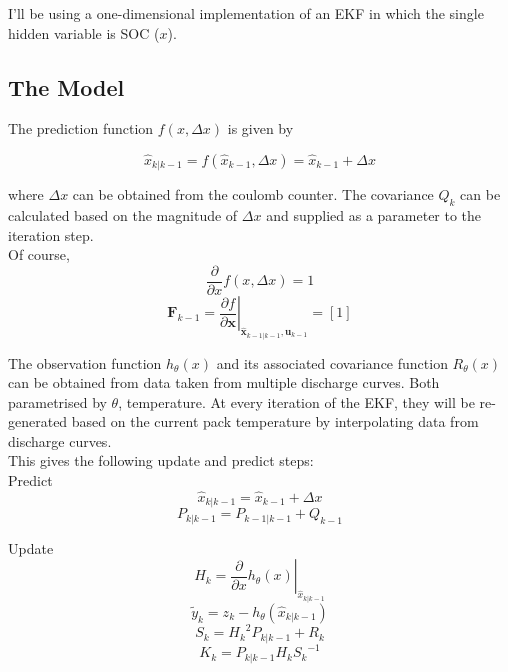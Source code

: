 \documentclass[letterpaper,12pt]{article} %
\begin{document}
I'll be using a one-dimensional implementation of an EKF in which the single hidden variable is SOC ($x$).

\newpage

\subsection{The Model}

The prediction function $ f(x, \Delta x) $ is given by

\begin{equation}
\hat{x}_{k|k-1} = f(\hat{x}_{k-1}, \Delta x) = \hat{x}_{k-1} + \Delta x
\end{equation}

where $ \Delta x $ can be obtained from the coulomb counter. The covariance $ Q_k $ can be calculated based on the magnitude of $ \Delta x $ and supplied as a parameter to the iteration step. \\

Of course,
\begin{equation}
\frac{\partial}{\partial x} f(x, \Delta x) = 1
\end{equation}
\begin{equation}
\boldsymbol{F}_{k-1} = \left . \frac{\partial f}{\partial \boldsymbol{x} } \right \vert _{\hat{\boldsymbol{x}}_{k-1|k-1},\boldsymbol{u}_{k-1}} = [1]
\end{equation}


The observation function $ h_{\theta}(x) $ and its associated covariance function $ R_{\theta}(x) $ can be obtained from data taken from multiple discharge curves. Both parametrised by $ \theta $, temperature. At every iteration of the EKF, they will be re-generated based on the current pack temperature by interpolating data from discharge curves.\\

This gives the following update and predict steps:\\

Predict
\begin{equation}
\hat{x}_{k|k-1} = \hat{x}_{k-1} + \Delta x
\end{equation}
\begin{equation}
P_{k|k-1} =  P_{k-1|k-1} + Q_{k-1}
\end{equation}

Update
\begin{equation}
H_k = \left. \frac{\partial}{\partial x}h_\theta(x) \right \vert _{\hat{x}_{k|k-1}}
\end{equation}
\begin{equation}
\tilde{y}_k = z_k - h_\theta(\hat{x}_{k|k-1})
\end{equation}
\begin{equation}
S_{k} = {H_k}^2 P_{k|k-1} + R_k
\end{equation}
\begin{equation}
K_k = P_{k|k-1} H_k {S_k}^{-1}
\end{equation}
\end{document}
